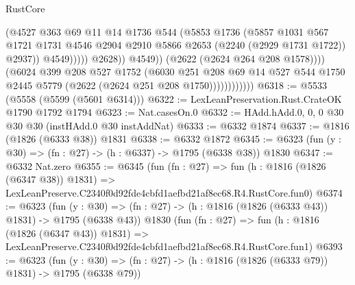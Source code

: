 \begin{lexlean}{RustCore}
\begin{coremodule}
                                        (@4527
                                          @363
                                          @69
                                          @11
                                          @14
                                          @1736
                                          @544
                                          (@5853
                                            @1736
                                            (@5857
                                              @1031
                                              @567
                                              @1721
                                              @1731
                                              @4546
                                              @2904
                                              @2910
                                              @5866
                                              @2653
                                              (@2240 (@2929 @1731 @1722))
                                              @2937))
                                          @4549)))))
                                @2628))
                            @4549))
                        (@2622 (@2624 @264 @208 @1578))))
                    (@6024
                      @399
                      @208
                      @527
                      @1752
                      (@6030
                        @251
                        @208
                        @69
                        @14
                        @527
                        @544
                        @1750
                        @2445
                        @5779
                        (@2622 (@2624 @251 @208 @1750))))))))))))
@6318 := @5533 (@5558 (@5599 (@5601 @6314)))
@6322 := LexLeanPreservation.Rust.CrateOK @1790 @1792 @1794
@6323 := Nat.casesOn.{0}
@6332 := HAdd.hAdd.{0, 0, 0} @30 @30 @30 (instHAdd.{0} @30 instAddNat)
@6333 := @6332 @1874
@6337 := @1816 (@1826 (@6333 @38)) @1831
@6338 := @6332 @1872
@6345 := @6323 (fun (y : @30) => (fn : @27) -> (h : @6337) -> @1795 (@6338 @38)) @1830
@6347 := @6332 Nat.zero
@6355 := @6345
    (fun (fn : @27) =>
    fun (h : @1816 (@1826 (@6347 @38)) @1831) =>
    LexLeanPreserve.C2340f0d92fde4cbfd1aefbd21af8ec68.R4.RustCore.fun0)
@6374 := @6323
    (fun (y : @30) => (fn : @27) -> (h : @1816 (@1826 (@6333 @43)) @1831) -> @1795 (@6338 @43))
    @1830
    (fun (fn : @27) =>
    fun (h : @1816 (@1826 (@6347 @43)) @1831) =>
    LexLeanPreserve.C2340f0d92fde4cbfd1aefbd21af8ec68.R4.RustCore.fun1)
@6393 := @6323
    (fun (y : @30) => (fn : @27) -> (h : @1816 (@1826 (@6333 @79)) @1831) -> @1795 (@6338 @79))

\end{coremodule}
\end{lexlean}
